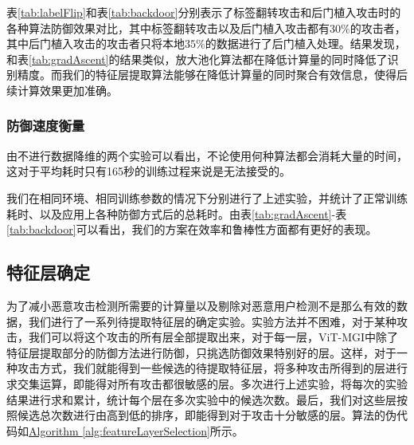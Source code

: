 \documentclass[conference]{IEEEtran}
\begin{document}
表\hyperref[tab:labelFlip]{\ref{tab:labelFlip}}和表\hyperref[tab:backdoor]{\ref{tab:backdoor}}分别表示了标签翻转攻击和后门植入攻击时的各种算法防御效果对比，其中标签翻转攻击以及后门植入攻击都有$30\%$的攻击者，其中后门植入攻击的攻击者只将本地$35\%$的数据进行了后门植入处理。结果发现，和表\hyperref[tab:gradAscent]{\ref{tab:gradAscent}}的结果类似，放大池化算法都在降低计算量的同时降低了识别精度。而我们的特征层提取算法能够在降低计算量的同时聚合有效信息，使得后续计算效果更加准确。

\subsubsection{\textbf{防御速度衡量}}

由不进行数据降维的两个实验可以看出，不论使用何种算法都会消耗大量的时间，这对于平均耗时只有165秒的训练过程来说是无法接受的。

我们在相同环境、相同训练参数的情况下分别进行了上述实验，并统计了正常训练耗时、以及应用上各种防御方式后的总耗时。由表\hyperref[tab:gradAscent]{\ref{tab:gradAscent}}-表\hyperref[tab:backdoor]{\ref{tab:backdoor}}可以看出，我们的方案在效率和鲁棒性方面都有更好的表现。

\subsection{特征层确定}
\label{exp:exp_layer}

为了减小恶意攻击检测所需要的计算量以及剔除对恶意用户检测不是那么有效的数据，我们进行了一系列待提取特征层的确定实验。实验方法并不困难，对于某种攻击，我们可以将这个攻击的所有层全部提取出来，对于每一层，ViT-MGI中除了特征层提取部分的防御方法进行防御，只挑选防御效果特别好的层。这样，对于一种攻击方式，我们就能得到一些候选的待提取特征层，将多种攻击所得到的层进行求交集运算，即能得对所有攻击都很敏感的层。多次进行上述实验，将每次的实验结果进行求和累计，统计每个层在多次实验中的候选次数。最后，我们对这些层按照候选总次数进行由高到低的排序，即能得到对于攻击十分敏感的层。算法的伪代码如\hyperref[alg:featureLayerSelection]{Algorithm \ref{alg:featureLayerSelection}}所示。

    
    
\end{document}
